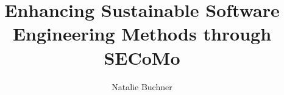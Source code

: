\documentclass[oribibl]{llncs}
\begin{document}
%
\frontmatter          %
%
\pagestyle{headings}  %

%
%
\mainmatter              %
%
\title{Enhancing Sustainable Software Engineering Methods through SECoMo}{}
%
%
\author{Natalie Buchner}
%
%
%

\maketitle              %
\end{document}
